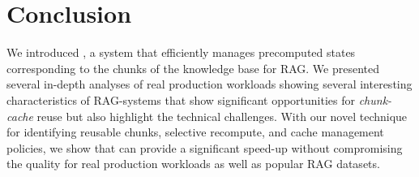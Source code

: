 \section{Conclusion}

We introduced \sys, a system that efficiently manages precomputed states corresponding to the chunks of the knowledge base for RAG. 
We presented several in-depth analyses of real production workloads showing several interesting characteristics of RAG-systems that show significant opportunities for \textit{chunk-cache} reuse but also highlight the technical challenges. 
With our novel technique for identifying reusable chunks, selective recompute, and cache management policies, we show that \sys can provide a significant speed-up without compromising the quality for real production workloads as well as popular RAG datasets. 

